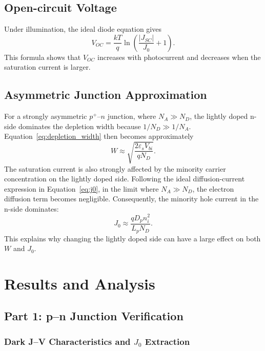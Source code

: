 \documentclass[11pt,a4paper]{article}
\newcommand{\jzero}{J_0}
\newcommand{\jsc}{J_{SC}}
\newcommand{\voc}{V_{OC}}
\newcommand{\vbi}{V_{bi}}
\newcommand{\Na}{N_A}
\newcommand{\Nd}{N_D}
\begin{document}
\subsection{Open-circuit Voltage}

Under illumination, the ideal diode equation gives
\begin{equation}
    \voc = \frac{kT}{q}\ln\left(\frac{|\jsc|}{\jzero}+1\right).
    \label{eq:voc}
\end{equation}
This formula shows that $\voc$ increases with photocurrent and decreases when the saturation current is larger.

\subsection{Asymmetric Junction Approximation}

For a strongly asymmetric $p^+$--$n$ junction, where $\Na \gg \Nd$, the lightly doped n-side dominates the depletion width because $1/\Nd \gg 1/\Na$. Equation~\ref{eq:depletion_width} then becomes approximately
\begin{equation}
    W \approx \sqrt{\frac{2\varepsilon_s \vbi}{q\Nd}}.
\end{equation}
The saturation current is also strongly affected by the minority carrier concentration on the lightly doped side. Following the ideal diffusion-current expression in Equation~\ref{eq:j0}, in the limit where $N_A \gg N_D$, the electron diffusion term becomes negligible. Consequently, the minority hole current in the n-side dominates:
\begin{equation}
    \jzero \approx \frac{qD_p n_i^2}{L_p\Nd}.
\end{equation}
This explains why changing the lightly doped side can have a large effect on both $W$ and $\jzero$.

\section{Results and Analysis}

\subsection{Part 1: p--n Junction Verification}

\subsubsection{Dark J--V Characteristics and \texorpdfstring{$\jzero$}{J0} Extraction}
\end{document}
